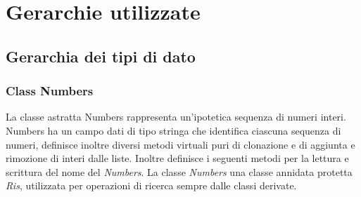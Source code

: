 \documentclass[a4paper,10pt]{article}
\begin{document}
	\section{Gerarchie utilizzate}
	\subsection{Gerarchia dei tipi di dato}
	\subsubsection{Class Numbers}
	La classe astratta Numbers rappresenta un’ipotetica sequenza di numeri interi. Numbers ha un campo dati di tipo stringa che identifica ciascuna sequenza di numeri, definisce inoltre diversi metodi virtuali puri di clonazione e di aggiunta e rimozione di interi dalle liste.
    Inoltre definisce i seguenti metodi per la lettura e scrittura del nome del \textit{Numbers}.
    La classe \textit{Numbers} una classe annidata protetta \textit{Ris}, utilizzata per operazioni di ricerca sempre dalle classi derivate.
    
\end{document}
